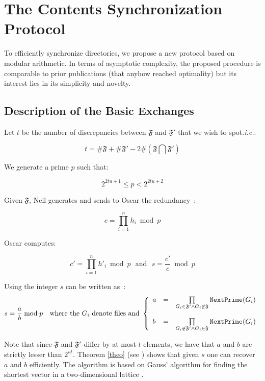 \documentclass[11pt]{llncs}
\begin{document}
\section{The Contents Synchronization Protocol}

To efficiently synchronize directories, we propose a new protocol based on modular arithmetic. In terms of asymptotic complexity, the proposed procedure is comparable to prior publications \cite{} (that anyhow reached optimality) but its interest lies in its simplicity and novelty.\smallskip

\subsection{Description of the Basic Exchanges}

Let $t$ be the number of discrepancies between $\mathfrak{F}$ and $\mathfrak{F}'$ that we wish to spot.{\sl i.e.}:

$$t=\#\mathfrak{F}+\#\mathfrak{F}'-2 \#(\mathfrak{F} \bigcap \mathfrak{F}')$$

We generate a prime $p$ such that:

\begin{equation}
\label{equp}
2^{2tu+1} \leq p < 2^{2tu+2}
\end{equation}

Given $\mathfrak{F}$, Neil generates and sends to Oscar the redundancy~:

\begin{equation}
c=\prod_{i=1}^n h_i \bmod p
\end{equation}

Oscar computes:\smallskip

$$c'=\prod_{i=1}^n h'_i \bmod p{~~~\mbox{and}~~~}s=\frac{c'}{c} \bmod p$$

Using \cite{vallee} the integer $s$ can be written as~:
$$s=\frac{a}{b} \bmod p{~~~\mbox{where the~}G_i\mbox{~denote files and~}}
\left\{
\begin{array}{lcr}
a & =&  \prod\limits_{G_i \in \mathfrak{F}'\wedge G_i \not\in\mathfrak{F}} \mbox{{\tt NextPrime}}(G_i) \\
\\
b & = & \prod\limits_{G_i \not\in\mathfrak{F}' \wedge G_i \in\mathfrak{F}} \mbox{{\tt NextPrime}}(G_i)
\end{array}
\right.
$$

Note that since $\mathfrak{F}$ and $\mathfrak{F}'$ differ by at most $t$ elements, we have that $a$ and $b$ are strictly lesser than $2^{ut}$. Theorem \ref{theo} (see \cite{cryptorational}) shows that given $s$ one can recover $a$ and $b$ efficiently. The algorithm is based on Gauss' algorithm for finding the shortest vector in a two-dimensional lattice \cite{vallee}.
\end{document}
